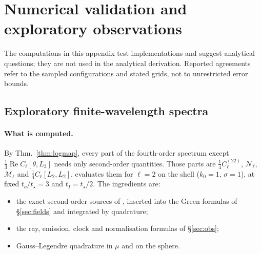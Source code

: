 \section{Numerical validation and exploratory observations}\label{app:numerics}
The computations in this appendix test implementations and suggest analytical questions;
they are not used in the analytical derivation. Reported agreements refer to the sampled
configurations and stated grids, not to unrestricted error bounds.



\subsection{Exploratory finite-wavelength spectra}
\paragraph{What is computed.}
By Thm.~\ref{thm:logmap}, every part of the fourth-order spectrum except
$\frac13\operatorname{Re}C_\ell[\theta,L_3]$ needs only second-order quantities. Those parts
are $\frac14C^{(22)}_\ell$, $\mathcal N_\ell$, $\mathcal M_\ell$ and $\frac14C_\ell[L_2,L_2]$.
 evaluates them for $\ell=2$ on the shell ($k_0=1$,
$\sigma=1$), at fixed $\bar t_o/\bar t_\star=3$ and $\bar t_I=\bar t_\star/2$. The ingredients
are:
\begin{itemize}
\item the exact second-order sources of , inserted into the Green
  formulas of \S\ref{sec:fields} and integrated by quadrature;
\item the ray, emission, clock and normalisation formulas of \S\ref{sec:obs};
\item Gauss--Legendre quadrature in $\mu$ and on the sphere.
\end{itemize}

